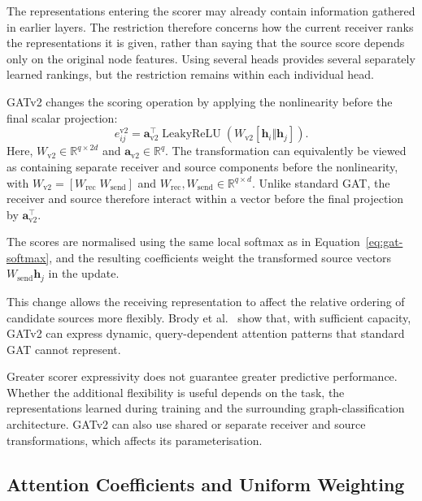 \documentclass[11pt,a4paper]{article}
\begin{document}
The representations entering the scorer may already contain information gathered in earlier layers. The restriction therefore concerns how the current receiver ranks the representations it is given, rather than saying that the source score depends only on the original node features. Using several heads provides several separately learned rankings, but the restriction remains within each individual head.

GATv2 changes the scoring operation by applying the nonlinearity before the final scalar projection:
\begin{equation}
e_{ij}^{\mathrm{v2}}
=
\mathbf{a}_{\mathrm{v2}}^{\top}
\operatorname{LeakyReLU}
\!\left(
W_{\mathrm{v2}}
[\mathbf{h}_i\Vert\mathbf{h}_j]
\right).
\label{eq:gatv2-score}
\end{equation}
Here, \(W_{\mathrm{v2}}\in\mathbb{R}^{q\times 2d}\) and \(\mathbf{a}_{\mathrm{v2}}\in\mathbb{R}^{q}\). The transformation can equivalently be viewed as containing separate receiver and source components before the nonlinearity, with \(W_{\mathrm{v2}}=[W_{\mathrm{rec}}\;W_{\mathrm{send}}]\) and \(W_{\mathrm{rec}},W_{\mathrm{send}}\in\mathbb{R}^{q\times d}\). Unlike standard GAT, the receiver and source therefore interact within a vector before the final projection by \(\mathbf{a}_{\mathrm{v2}}^{\top}\).

The scores are normalised using the same local softmax as in Equation~\eqref{eq:gat-softmax}, and the resulting coefficients weight the transformed source vectors \(W_{\mathrm{send}}\mathbf{h}_j\) in the update.

This change allows the receiving representation to affect the relative ordering of candidate sources more flexibly. Brody et al.~\cite{brody2022attentive} show that, with sufficient capacity, GATv2 can express dynamic, query-dependent attention patterns that standard GAT cannot represent.

Greater scorer expressivity does not guarantee greater predictive performance. Whether the additional flexibility is useful depends on the task, the representations learned during training and the surrounding graph-classification architecture. GATv2 can also use shared or separate receiver and source transformations, which affects its parameterisation.

\subsection{Attention Coefficients and Uniform Weighting}
\label{sec:uniform-background}
\end{document}

